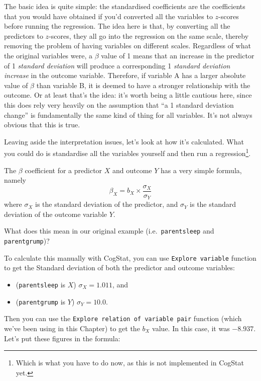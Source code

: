 \documentclass[
]{book}
\providecommand{\tightlist}{%
  \setlength{\itemsep}{0pt}\setlength{\parskip}{0pt}}
\theoremstyle{definition}
\theoremstyle{definition}
\theoremstyle{definition}
\theoremstyle{definition}
\theoremstyle{remark}
\begin{document}
The basic idea is quite simple: the standardised coefficients are the coefficients that you would have obtained if you'd converted all the variables to \(z\)-scores before running the regression. The idea here is that, by converting all the predictors to \(z\)-scores, they all go into the regression on the same scale, thereby removing the problem of having variables on different scales. Regardless of what the original variables were, a \(\beta\) value of 1 means that an increase in the predictor of 1 \emph{standard deviation} will produce a corresponding 1 \emph{standard deviation increase} in the outcome variable. Therefore, if variable A has a larger absolute value of \(\beta\) than variable B, it is deemed to have a stronger relationship with the outcome. Or at least that's the idea: it's worth being a little cautious here, since this does rely very heavily on the assumption that ``a 1 standard deviation change'' is fundamentally the same kind of thing for all variables. It's not always obvious that this is true.

Leaving aside the interpretation issues, let's look at how it's calculated. What you could do is standardise all the variables yourself and then run a regression\footnote{Which is what you have to do now, as this is not implemented in CogStat yet.}.

The \(\beta\) coefficient for a predictor \(X\) and outcome \(Y\) has a very simple formula, namely
\[
\beta_X = b_X \times \frac{\sigma_X}{\sigma_Y} 
\]
where \(\sigma_X\) is the standard deviation of the predictor, and \(\sigma_Y\) is the standard deviation of the outcome variable \(Y\).

What does this mean in our original example (i.e.~\texttt{parentsleep} and \texttt{parentgrump})?

To calculate this manually with CogStat, you can use \texttt{Explore\ variable} function to get the Standard deviation of both the predictor and outcome variables:

\begin{itemize}
\tightlist
\item
  (\texttt{parentsleep} is \(X\)) \(\sigma_X = 1.011\), and
\item
  (\texttt{parentgrump} is \(Y\)) \(\sigma_Y = 10.0\).
\end{itemize}

Then you can use the \texttt{Explore\ relation\ of\ variable\ pair} function (which we've been using in this Chapter) to get the \(b_X\) value. In this case, it was \(-8.937\). Let's put these figures in the formula:
\end{document}
